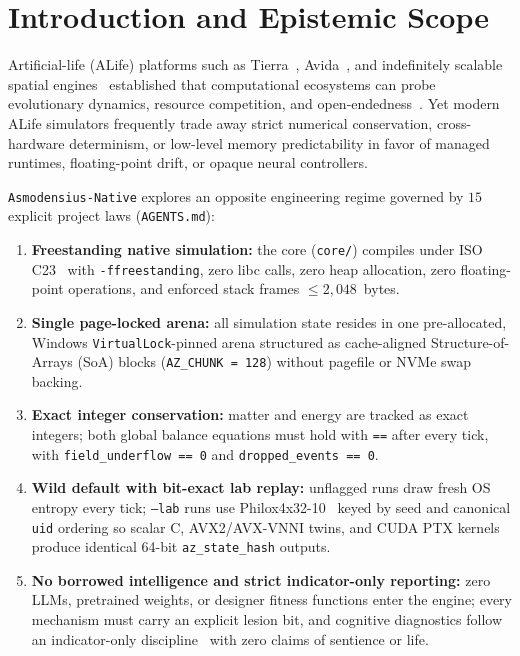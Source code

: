 \documentclass[11pt,reqno]{amsart}
\newcommand{\code}[1]{\texttt{\footnotesize #1}}
\newcommand{\us}{\_\allowbreak}
\begin{document}
\maketitle

\section{Introduction and Epistemic Scope}

Artificial-life (ALife) platforms such as Tierra~\cite{ray1991approach}, Avida~\cite{ofria2004avida}, and indefinitely scalable spatial engines~\cite{ackley2014indefinitely} established that computational ecosystems can probe evolutionary dynamics, resource competition, and open-endedness~\cite{bedau2000open,taylor2016open,packard2019overview}. Yet modern ALife simulators frequently trade away strict numerical conservation, cross-hardware determinism, or low-level memory predictability in favor of managed runtimes, floating-point drift, or opaque neural controllers.

\code{Asmodensius-Native} explores an opposite engineering regime governed by $15$ explicit project laws (\code{AGENTS.md}):
\begin{enumerate}[leftmargin=2.0em,itemsep=2pt]
  \item \textbf{Freestanding native simulation:} the core (\code{core/}) compiles under ISO C23~\cite{iso2024c23} with \code{-ffreestanding}, zero libc calls, zero heap allocation, zero floating-point operations, and enforced stack frames $\le 2{,}048$~bytes.
  \item \textbf{Single page-locked arena:} all simulation state resides in one pre-allocated, Windows \code{VirtualLock}-pinned arena structured as cache-aligned Structure-of-Arrays (SoA) blocks (\code{AZ\us CHUNK = 128}) without pagefile or NVMe swap backing.
  \item \textbf{Exact integer conservation:} matter and energy are tracked as exact integers; both global balance equations must hold with \code{==} after every tick, with \code{field\us underflow == 0} and \code{dropped\us events == 0}.
  \item \textbf{Wild default with bit-exact lab replay:} unflagged runs draw fresh OS entropy every tick; \code{--lab} runs use Philox4x32-10~\cite{salmon2011parallel} keyed by seed and canonical \code{uid} ordering so scalar C, AVX2/AVX-VNNI twins, and CUDA PTX kernels produce identical 64-bit \code{az\us state\us hash} outputs.
  \item \textbf{No borrowed intelligence and strict indicator-only reporting:} zero LLMs, pretrained weights, or designer fitness functions enter the engine; every mechanism must carry an explicit lesion bit, and cognitive diagnostics follow an indicator-only discipline~\cite{butlin2023consciousness} with zero claims of sentience or life.
\end{enumerate}
\end{document}
